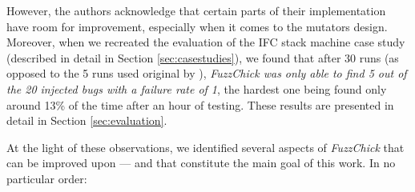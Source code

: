 \documentclass[acmsmall, anonymous]{acmart}
\newcommand{\fuzzchick}{\textit{FuzzChick}\xspace}
\begin{document}
However, the authors acknowledge that certain parts of their implementation have
room for improvement, especially when it comes to the mutators design.
%
Moreover, when we recreated the evaluation of the IFC stack machine case study
(described in detail in Section \ref{sec:casestudies}), we found that after 30
runs (as opposed to the 5 runs used original by
\citeauthor{lampropoulos2019coverage}), \emph{\fuzzchick was only able to find 5
  out of the 20 injected bugs with a failure rate of 1}, the hardest one being
found only around 13\% of the time after an hour of testing.
%
These results are presented in detail in Section \ref{sec:evaluation}.


At the light of these observations, we identified several aspects of \fuzzchick
that can be improved upon --- and that constitute the main goal of this work.
%
In no particular order:
%
\end{document}
